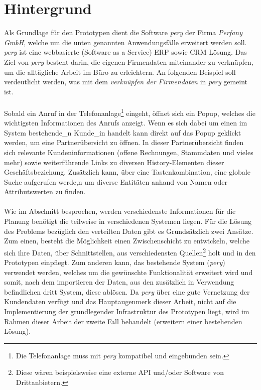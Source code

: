 \documentclass[Bachelorarbeit.tex]{subfiles}
\begin{document}
\section{Hintergrund}
\label{chap:einfuehrung:sec:hintergrund}
Als Grundlage für den Prototypen dient die Software \textit{pery} der Firma \textit{Perfany GmbH}, welche um die unten genannten Anwendungsfälle erweitert werden soll. 
\textit{pery} ist eine webbasierte (Software as a Service) \ac{ERP} sowie \ac{CRM} Lösung.
Das Ziel von \textit{pery} besteht darin, die eigenen Firmendaten miteinander zu verknüpfen, um die alltägliche Arbeit im Büro zu erleichtern.
An folgenden Beispiel soll verdeutlicht werden, was mit dem \textit{verknüpfen der Firmendaten} in \textit{pery} gemeint ist.\\
\\
Sobald ein Anruf in der Telefonanlage\footnote{Die Telefonanlage muss mit \textit{pery} kompatibel und eingebunden sein.} eingeht, öffnet sich ein Popup, welches die wichtigsten Informationen des Anrufs anzeigt. 
Wenn es sich dabei um einen im System bestehende\_n Kunde\_in handelt kann direkt auf das Popup geklickt werden, um eine Partnerübersicht zu öffnen.
In dieser Partnerübersicht finden sich relevante Kundeninformationen (offene Rechnungen, Stammdaten und vieles mehr) sowie weiterführende Links zu diversen History-Elementen dieser Geschäftsbeziehung.
Zusätzlich kann, über eine Tastenkombination, eine globale Suche aufgerufen werde,n um diverse Entitäten anhand von Namen oder Attributswerten zu finden. \\
\\
Wie im Abschnitt  besprochen, werden verschiedenste Informationen für die Planung benötigt die teilweise in verschiedenen Systemen liegen. 
Für die Lösung des Problems bezüglich den verteilten Daten gibt es Grundsätzlich zwei Ansätze.
Zum einen, besteht die Möglichkeit einen Zwischenschicht zu entwickeln, welche sich ihre Daten, über Schnittstellen, aus verschiedensten Quellen\footnote{Diese wären beispielsweise eine externe \ac{API} und/oder Software von Drittanbietern.} holt und in den Prototypen einpflegt.
Zum anderen kann, das bestehende System (\textit{pery}) verwendet werden, welches um die gewünschte Funktionalität erweitert wird und somit, nach dem importieren der Daten, aus den zusätzlich in Verwendung befindlichen dritt System, diese ablösen. 
Da \textit{pery} über eine gute Vernetzung der Kundendaten verfügt und das Hauptaugenmerk dieser Arbeit, nicht auf die Implementierung der grundlegender Infrastruktur des Prototypen liegt, wird im Rahmen dieser Arbeit der zweite Fall behandelt (erweitern einer bestehenden Lösung).
\end{document}
